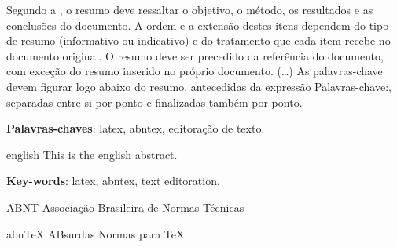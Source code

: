 \documentclass[
	12pt,				%
	oneside,			%
	a4paper,			%
	english,			%
	brazil				%
	]{abntex2}
\renewcommand{\listfigurename}{Lista de figuras}%
\begin{document}
\setlength{\absparsep}{18pt} %
\begin{resumo}
 Segundo a , o resumo deve ressaltar o
 objetivo, o método, os resultados e as conclusões do documento. A ordem e a extensão
 destes itens dependem do tipo de resumo (informativo ou indicativo) e do
 tratamento que cada item recebe no documento original. O resumo deve ser
 precedido da referência do documento, com exceção do resumo inserido no
 próprio documento. (\ldots) As palavras-chave devem figurar logo abaixo do
 resumo, antecedidas da expressão Palavras-chave:, separadas entre si por
 ponto e finalizadas também por ponto.

 \noindent
 \textbf{Palavras-chaves}: latex, abntex, editoração de texto.
\end{resumo}

\begin{resumo}[Abstract]
 \begin{otherlanguage*}{english}
   This is the english abstract.

   \noindent
   \textbf{Key-words}: latex, abntex, text editoration.
 \end{otherlanguage*}
\end{resumo}

\pdfbookmark[0]{\listfigurename}{lof}
\listoffigures*
\cleardoublepage

\listoftables*
\cleardoublepage

\begin{siglas}
  \item[ABNT] Associação Brasileira de Normas Técnicas
  \item[abnTeX] ABsurdas Normas para TeX
\end{siglas}

\tableofcontents*
\cleardoublepage


\textual

\end{document}
